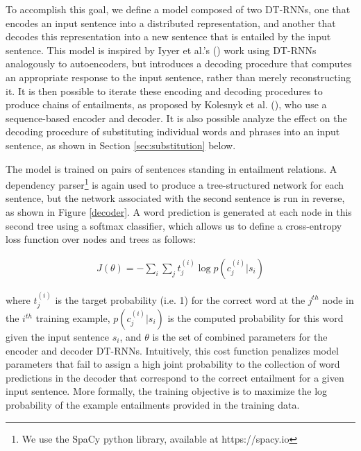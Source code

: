 \documentclass[utf8]{frontiersSCNS} %
\begin{document}
To accomplish this goal, we define a model composed of two DT-RNNs, one that encodes an input sentence into a distributed representation, and another that decodes this representation into a new sentence that is entailed by the input sentence. This model is inspired by Iyyer et al.'s (\citeyear{Iyyer:2014}) work using DT-RNNs analogously to autoencoders, but introduces a decoding procedure that computes an appropriate response to the input sentence, rather than merely reconstructing it. It is then possible to iterate these encoding and decoding procedures to produce chains of entailments, as proposed by Kolesnyk et al. (\citeyear{Kolesnyk:2016}), who use a sequence-based encoder and decoder. It is also possible analyze the effect on the decoding procedure of substituting individual words and phrases into an input sentence, as shown in Section \ref{sec:substitution} below. 

The model is trained on pairs of sentences standing in entailment relations. A dependency parser\footnote{We use the SpaCy python library, available at https://spacy.io} is again used to produce a tree-structured network for each sentence, but the network associated with the second sentence is run in reverse, as shown in Figure \ref{decoder}. A word prediction is generated at each node in this second tree using a softmax classifier, which allows us to define a cross-entropy loss function over nodes and trees as follows: 

\begin{align}
J(\theta) = - \sum_{i} \sum_{j} t^{(i)}_j \log{ p(c^{(i)}_j | s_i)}
\end{align}

\noindent
where $t^{(i)}_j$ is the target probability (i.e. 1) for the correct word at the $j^{th}$ node in the $i^{th}$ training example, $p(c^{(i)}_j | s_i)$ is the computed probability for this word given the input sentence $s_i$, and $\theta$ is the set of combined parameters for the encoder and decoder DT-RNNs. Intuitively, this cost function penalizes model parameters that fail to assign a high joint probability to the collection of word predictions in the decoder that correspond to the correct entailment for a given input sentence. More formally, the training objective is to maximize the log probability of the example entailments provided in the training data.
\end{document}
